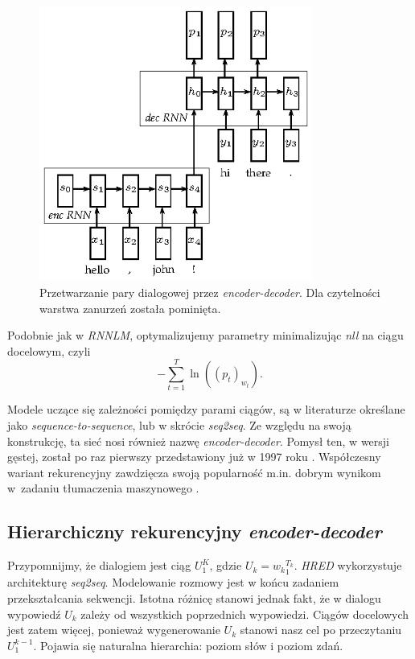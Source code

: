\begin{figure}[ht]
  \centering
    \includegraphics[width=0.8\textwidth]{chapter3/img/encdec.eps}
  \caption{\small{Przetwarzanie pary dialogowej przez \textit{encoder-decoder}. Dla czytelności warstwa zanurzeń została pominięta.}}
\end{figure}

Podobnie jak w \textit{RNNLM}, optymalizujemy parametry minimalizując \textit{nll} na ciągu docelowym, czyli
\[-\sum\limits_{t=1}^T \ln((p_t)_{w_t}).\]

Modele uczące się zależności pomiędzy parami ciągów, są w literaturze określane jako \textit{sequence-to-sequence}, lub w skrócie \textit{seq2seq}. Ze względu na swoją konstrukcję, ta sieć nosi również nazwę \textit{encoder-decoder}. Pomysł ten, w wersji gęstej, został po raz pierwszy przedstawiony już w 1997 roku \cite{encdecfirst}. Współczesny wariant rekurencyjny zawdzięcza swoją popularność m.in. dobrym wynikom w~zadaniu tłumaczenia maszynowego \cite{encdec}.


\subsection{Hierarchiczny rekurencyjny \textit{encoder-decoder}}
Przypomnijmy, że dialogiem jest ciąg $U_1^K$, gdzie $U_k = {w_k}_1^{T_k}$. \textit{HRED} wykorzystuje architekturę \textit{seq2seq}. Modelowanie rozmowy jest w końcu zadaniem przekształcania sekwencji. Istotna różnicę stanowi jednak fakt, że w dialogu wypowiedź $U_k$ zależy od wszystkich poprzednich wypowiedzi. Ciągów docelowych jest zatem więcej, ponieważ wygenerowanie $U_k$ stanowi nasz cel po przeczytaniu $U_1^{k-1}$. Pojawia się naturalna hierarchia: poziom słów i poziom zdań.

